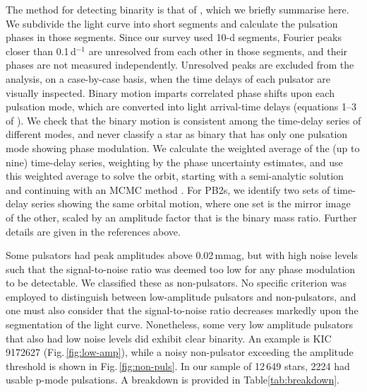 \documentclass[a4paper,fleqn,usenatbib]{mnras}
\begin{document}
The method for detecting binarity is that of \citet{murphyetal2014}, which we briefly summarise here. We subdivide the light curve into short segments and calculate the pulsation phases in those segments. Since our survey used 10-d segments, Fourier peaks closer than 0.1\,d$^{-1}$ are unresolved from each other in those segments, and their phases are not measured independently. Unresolved peaks are excluded from the analysis, on a case-by-case basis, when the time delays of each pulsator are visually inspected. Binary motion imparts correlated phase shifts upon each pulsation mode, which are converted into light arrival-time delays (equations 1--3 of \citealt{murphyetal2014}). We check that the binary motion is consistent among the time-delay series of different modes, and never classify a star as binary that has only one pulsation mode showing phase modulation. We calculate the weighted average of the (up to nine) time-delay series, weighting by the phase uncertainty estimates, and use this weighted average to solve the orbit, starting with a semi-analytic solution \citep{murphy&shibahashi2015} and continuing with an MCMC method \citep{murphyetal2016b}. For PB2s, we identify two sets of time-delay series showing the same orbital motion, where one set is the mirror image of the other, scaled by an amplitude factor that is the binary mass ratio. Further details are given in the references above.

Some pulsators had peak amplitudes above 0.02\,mmag, but with high noise levels such that the signal-to-noise ratio was deemed too low for any phase modulation to be detectable. We classified these as non-pulsators. No specific criterion was employed to distinguish between low-amplitude pulsators and non-pulsators, and one must also consider that the signal-to-noise ratio decreases markedly upon the segmentation of the light curve. Nonetheless, some very low amplitude pulsators that also had low noise levels did exhibit clear binarity. An example is KIC\,9172627 (Fig.\,\ref{fig:low-amp}), while a noisy non-pulsator exceeding the amplitude threshold is shown in Fig.\,\ref{fig:non-puls}. In our sample of 12\,649 stars, 2224 had usable p-mode pulsations. A breakdown is provided in Table\:\ref{tab:breakdown}.
\end{document}
